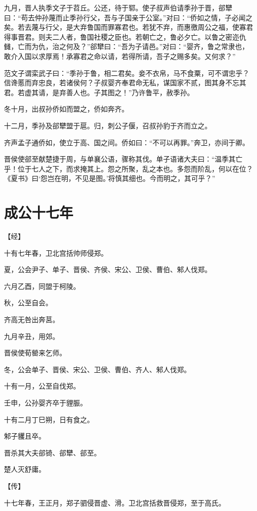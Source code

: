 \documentclass[a4paper,12pt,UTF8,twoside]{ctexbook}
\begin{document}
九月，晋人执季文子于苕丘。公还，待于郓。使子叔声伯请季孙于晋，郤犫曰：“苟去仲孙蔑而止季孙行父，吾与子国亲于公室。”对曰：“侨如之情，子必闻之矣。若去蔑与行父，是大弃鲁国而罪寡君也。若犹不弃，而惠徼周公之福，使寡君得事晋君。则夫二人者，鲁国社稷之臣也。若朝亡之，鲁必夕亡。以鲁之密迩仇雠，亡而为仇，治之何及？”郤犫曰：“吾为子请邑。”对曰：“婴齐，鲁之常隶也，敢介入国以求厚焉！承寡君之命以请，若得所请，吾子之赐多矣。又何求？”

范文子谓栾武子曰：“季孙于鲁，相二君矣。妾不衣帛，马不食粟，可不谓忠乎？信谗慝而弃忠良，若诸侯何？子叔婴齐奉君命无私，谋国家不贰，图其身不忘其君。若虚其请，是弃善人也。子其图之！”乃许鲁平，赦季孙。



冬十月，出叔孙侨如而盟之，侨如奔齐。

十二月，季孙及郤犫盟于扈。归，刺公子偃，召叔孙豹于齐而立之。

齐声孟子通侨如，使立于高、国之间。侨如曰：“不可以再罪。”奔卫，亦间于卿。

晋侯使郤至献楚捷于周，与单襄公语，骤称其伐。单子语诸大夫曰：“温季其亡乎！位于七人之下，而求掩其上。怨之所聚，乱之本也。多怨而阶乱，何以在位？《夏书》曰‘怨岂在明，不见是图。’将慎其细也。今而明之，其可乎？”

\chapter{成公十七年}



【经】

十有七年春，卫北宫括帅师侵郑。

夏，公会尹子、单子、晋侯、齐侯、宋公、卫侯、曹伯、邾人伐郑。

六月乙酉，同盟于柯陵。

秋，公至自会。

齐高无咎出奔莒。

九月辛丑，用郊。

晋侯使荀罃来乞师。

冬，公会单子、晋侯、宋公、卫侯、曹伯、齐人、邾人伐郑。

十有一月，公至自伐郑。

壬申，公孙婴齐卒于貍脤。

十有二月丁巳朔，日有食之。

邾子貜且卒。

晋杀其大夫郤锜、郤犫、郤至。

楚人灭舒庸。

【传】

十七年春，王正月，郑子驷侵晋虚、滑。卫北宫括救晋侵郑，至于高氏。
\end{document}
